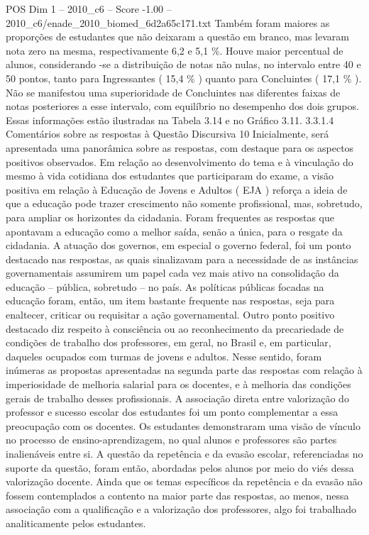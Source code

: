 \begin{textsample}{POS Dim 1 – 2010\_c6 – Score -1.00 – 2010\_c6/enade\_2010\_biomed\_6d2a65c171.txt}
Também foram maiores as proporções de estudantes que não deixaram a questão em branco, mas levaram nota zero na mesma, respectivamente 6,2 e 5,1 \%.
Houve maior percentual de alunos, considerando -se a distribuição de notas não nulas, no intervalo entre 40 e 50 pontos, tanto para Ingressantes ( 15,4 \% ) quanto para Concluintes ( 17,1 \% ).
Não se manifestou uma superioridade de Concluintes nas diferentes faixas de notas posteriores a esse intervalo, com equilíbrio no desempenho dos dois grupos.
Essas informações estão ilustradas na Tabela 3.14 e no Gráfico 3.11. 3.3.1.4 Comentários sobre as respostas à Questão Discursiva 10 Inicialmente, será apresentada uma panorâmica sobre as respostas, com destaque para os aspectos positivos observados.
Em relação ao desenvolvimento do tema e à vinculação do mesmo à vida cotidiana dos estudantes que participaram do exame, a visão positiva em relação à Educação de Jovens e Adultos ( EJA ) reforça a ideia de que a educação pode trazer crescimento não somente profissional, mas, sobretudo, para ampliar os horizontes da cidadania.
Foram frequentes as respostas que apontavam a educação como a melhor saída, senão a única, para o resgate da cidadania.
A atuação dos governos, em especial o governo federal, foi um ponto destacado nas respostas, as quais sinalizavam para a necessidade de as instâncias governamentais assumirem um papel cada vez mais ativo na consolidação da educação – pública, sobretudo – no país.
As políticas públicas focadas na educação foram, então, um item bastante frequente nas respostas, seja para enaltecer, criticar ou requisitar a ação governamental.
Outro ponto positivo destacado diz respeito à consciência ou ao reconhecimento da precariedade de condições de trabalho dos professores, em geral, no Brasil e, em particular, daqueles ocupados com turmas de jovens e adultos.
Nesse sentido, foram inúmeras as propostas apresentadas na segunda parte das respostas com relação à imperiosidade de melhoria salarial para os docentes, e à melhoria das condições gerais de trabalho desses profissionais.
A associação direta entre valorização do professor e sucesso escolar dos estudantes foi um ponto complementar a essa preocupação com os docentes.
Os estudantes demonstraram uma visão de vínculo no processo de ensino-aprendizagem, no qual alunos e professores são partes inalienáveis entre si.
A questão da repetência e da evasão escolar, referenciadas no suporte da questão, foram então, abordadas pelos alunos por meio do viés dessa valorização docente.
Ainda que os temas específicos da repetência e da evasão não fossem contemplados a contento na maior parte das respostas, ao menos, nessa associação com a qualificação e a valorização dos professores, algo foi trabalhado analiticamente pelos estudantes.

\end{textsample}
